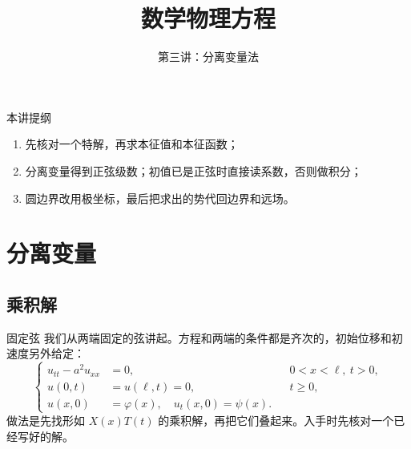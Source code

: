 \documentclass[fontset=windows, chinese, 10pt, xcolor=dvipsnames]{beamer}
\title{数学物理方程}
\subtitle{第三讲：分离变量法}
\begin{document}
\begin{frame}
  \titlepage
\end{frame}



\begin{frame}{本讲提纲}
  \begin{enumerate}
    \item 先核对一个特解，再求本征值和本征函数；
    \item 分离变量得到正弦级数；初值已是正弦时直接读系数，否则做积分；
    \item 圆边界改用极坐标，最后把求出的势代回边界和远场。
  \end{enumerate}
\end{frame}

\section{分离变量}

\subsection{乘积解}

\begin{frame}{固定弦}
  我们从两端固定的弦讲起。方程和两端的条件都是齐次的，初始位移和初速度另外给定：
  \begin{equation*}
    \left\{
    \begin{aligned}
      u_{tt}-a^2u_{xx}&=0, && 0<x<\ell,\ t>0,\\
      u(0,t)&=u(\ell,t)=0, && t\geq 0,\\
      u(x,0)&=\varphi(x),\quad u_t(x,0)=\psi(x).
    \end{aligned}
    \right.
  \end{equation*}
  做法是先找形如 $X(x)T(t)$ 的乘积解，再把它们叠起来。入手时先核对一个已经写好的解。
\end{frame}
\end{document}
